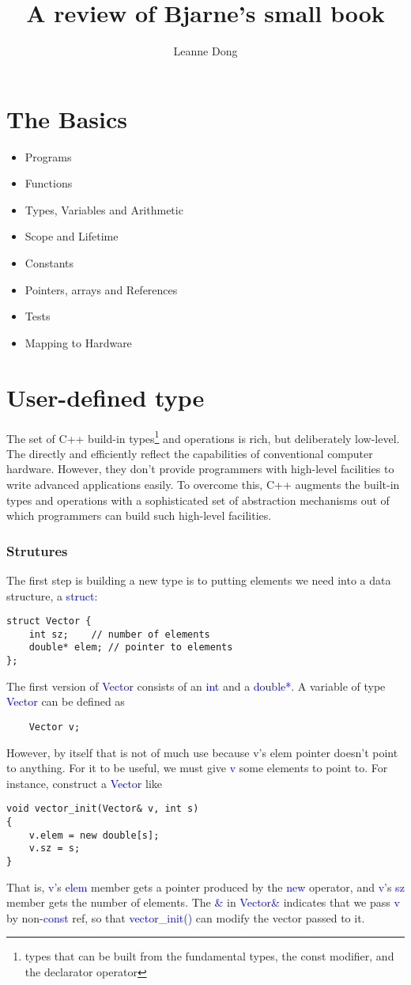 \documentclass{article}
\title{A review of Bjarne's small book}
\author{Leanne Dong}
\newcommand{\blue}[1]{\textcolor{blue}{#1}}
\begin{document}
	\maketitle
\section{The Basics}
\begin{itemize}
	\item Programs
	\item Functions
	\item Types, Variables and Arithmetic
	\item Scope and Lifetime
	\item Constants
	\item Pointers, arrays and References
	\item Tests
	\item Mapping to Hardware
\end{itemize}
\section{User-defined type}
The set of C++ build-in types\footnote{types that can be built from the fundamental types, the const modifier, and the declarator operator} and operations is rich, but deliberately low-level. The directly and efficiently reflect the capabilities of conventional computer hardware. However, they don't provide programmers with high-level facilities to write advanced applications easily. To overcome this, C++ augments the built-in types and operations with a sophisticated set of abstraction mechanisms out of which programmers can build such high-level facilities.

\subsubsection{Strutures}

The first step is building a new type is to putting elements we need into a data structure, a \blue{struct}:

\begin{verbatim}
struct Vector {
    int sz;    // number of elements
    double* elem; // pointer to elements
};	
\end{verbatim}
The first version of \blue{Vector} consists of an \blue{int} and a \blue{double*}. A variable of type \blue{Vector} can be defined as 
\begin{verbatim}
	Vector v;
\end{verbatim}
However, by itself that is not of much use because v's elem pointer doesn't point to anything. For it to be useful, we must give \blue{v} some elements to point to. For instance, construct a \blue{Vector} like
\begin{verbatim}
void vector_init(Vector& v, int s)
{
    v.elem = new double[s];
    v.sz = s;
}	
\end{verbatim}
That is, \blue{v}'s \blue{elem} member gets a pointer produced by the \blue{new} operator, and \blue{v}'s \blue{sz} member gets the number of elements. The \blue{\&} in \blue{Vector\&} indicates that we pass \blue{v} by non-\blue{const} ref, so that \blue{vector\_init()} can modify the vector passed to it.
\end{document}
